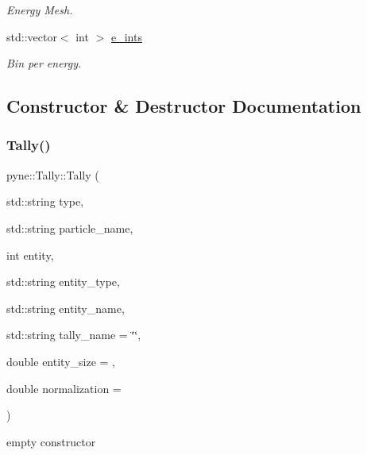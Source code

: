 \begin{DoxyCompactItemize}
\begin{DoxyCompactList}\small\item\em Energy Mesh. \end{DoxyCompactList}\item 
\mbox{\label{classpyne_1_1_tally_ac92555231fcf5dcea1781831ad902e87}} 
std\+::vector$<$ int $>$ \hyperlink{classpyne_1_1_tally_ac92555231fcf5dcea1781831ad902e87}{e\+\_\+ints}
\begin{DoxyCompactList}\small\item\em Bin per energy. \end{DoxyCompactList}\end{DoxyCompactItemize}


\subsection{Constructor \& Destructor Documentation}
\mbox{\label{classpyne_1_1_tally_a882081e3a6f1628d1b7941003d5ccfad}} 
\subsubsection{\texorpdfstring{Tally()}{Tally()}\hspace{0.1cm}{\footnotesize\ttfamily [1/3]}}
{\footnotesize\ttfamily pyne\+::\+Tally\+::\+Tally (\begin{DoxyParamCaption}\item[{std\+::string}]{type,  }\item[{std\+::string}]{particle\+\_\+name,  }\item[{int}]{entity,  }\item[{std\+::string}]{entity\+\_\+type,  }\item[{std\+::string}]{entity\+\_\+name,  }\item[{std\+::string}]{tally\+\_\+name = {\ttfamily \char`\"{}\char`\"{}},  }\item[{double}]{entity\+\_\+size = {},  }\item[{double}]{normalization = {} }\end{DoxyParamCaption})}



empty constructor 

